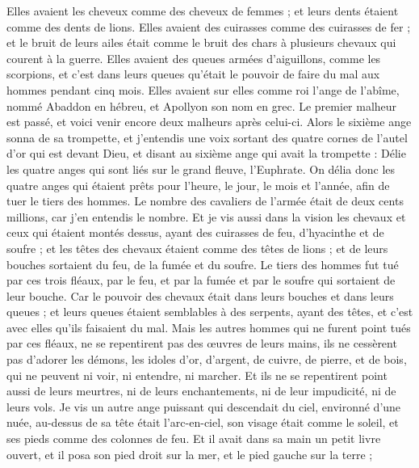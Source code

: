 \begin{multicols}{2}
Elles avaient les cheveux comme des cheveux de femmes ; et leurs dents étaient comme des dents de lions.
Elles avaient des cuirasses comme des cuirasses de fer ; et le bruit de leurs ailes était comme le bruit des chars à plusieurs chevaux qui courent à la guerre.
Elles avaient des queues armées d'aiguillons, comme les scorpions, et c'est dans leurs queues qu'était le pouvoir de faire du mal aux hommes pendant cinq mois.
Elles avaient sur elles comme roi l'ange de l'abîme, nommé Abaddon en hébreu, et Apollyon son nom en grec.
Le premier malheur est passé, et voici venir encore deux malheurs après celui-ci.
Alors le sixième ange sonna de sa trompette, et j'entendis une voix sortant des quatre cornes de l'autel d'or qui est devant Dieu,
et disant au sixième ange qui avait la trompette : Délie les quatre anges qui sont liés sur le grand fleuve, l'Euphrate.
On délia donc les quatre anges qui étaient prêts pour l'heure, le jour, le mois et l'année, afin de tuer le tiers des hommes.
Le nombre des cavaliers de l'armée était de deux cents millions, car j'en entendis le nombre.
Et je vis aussi dans la vision les chevaux et ceux qui étaient montés dessus, ayant des cuirasses de feu, d'hyacinthe et de soufre ; et les têtes des chevaux étaient comme des têtes de lions ; et de leurs bouches sortaient du feu, de la fumée et du soufre.
Le tiers des hommes fut tué par ces trois fléaux, par le feu, et par la fumée et par le soufre qui sortaient de leur bouche.
Car le pouvoir des chevaux était dans leurs bouches et dans leurs queues ; et leurs queues étaient semblables à des serpents, ayant des têtes, et c'est avec elles qu'ils faisaient du mal.
Mais les autres hommes qui ne furent point tués par ces fléaux, ne se repentirent pas des œuvres de leurs mains, ils ne cessèrent pas d'adorer les démons, les idoles d'or, d'argent, de cuivre, de pierre, et de bois, qui ne peuvent ni voir, ni entendre, ni marcher.
Et ils ne se repentirent point aussi de leurs meurtres, ni de leurs enchantements, ni de leur impudicité, ni de leurs vols.
\VerseOne{}Je vis un autre ange puissant qui descendait du ciel, environné d'une nuée, au-dessus de sa tête était l'arc-en-ciel, son visage était comme le soleil, et ses pieds comme des colonnes de feu.
Et il avait dans sa main un petit livre ouvert, et il posa son pied droit sur la mer, et le pied gauche sur la terre ;

\end{multicols}
